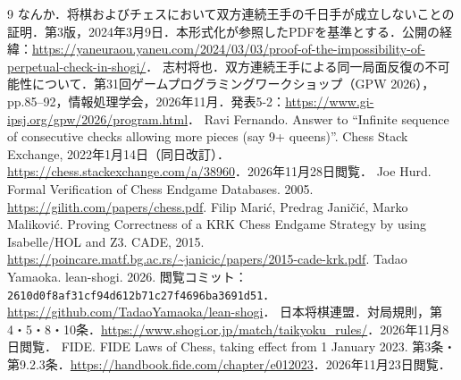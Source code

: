 \documentclass[a4paper,11pt]{article}
\theoremstyle{definition}
\begin{document}
\begin{thebibliography}{9}
なんか．将棋およびチェスにおいて双方連続王手の千日手が成立しないことの証明．第3版，2024年3月9日．本形式化が参照したPDFを基準とする．公開の経緯：\url{https://yaneuraou.yaneu.com/2024/03/03/proof-of-the-impossibility-of-perpetual-check-in-shogi/}．
志村将也．双方連続王手による同一局面反復の不可能性について．第31回ゲームプログラミングワークショップ（GPW 2026），pp.85--92，情報処理学会，2026年11月．発表5-2：\url{https://www.gi-ipsj.org/gpw/2026/program.html}．
Ravi Fernando. Answer to ``Infinite sequence of consecutive checks allowing more pieces (say 9+ queens)''. Chess Stack Exchange, 2022年1月14日（同日改訂）．\url{https://chess.stackexchange.com/a/38960}．2026年11月28日閲覧．
Joe Hurd. Formal Verification of Chess Endgame Databases. 2005. \url{https://gilith.com/papers/chess.pdf}.
Filip Marić, Predrag Janičić, Marko Maliković. Proving Correctness of a KRK Chess Endgame Strategy by using Isabelle/HOL and Z3. CADE, 2015. \url{https://poincare.matf.bg.ac.rs/~janicic/papers/2015-cade-krk.pdf}.
Tadao Yamaoka. lean-shogi. 2026. 閲覧コミット：\nolinkurl{2610d0f8af31cf94d612b71c27f4696ba3691d51}．\url{https://github.com/TadaoYamaoka/lean-shogi}．
日本将棋連盟．対局規則，第4・5・8・10条．\url{https://www.shogi.or.jp/match/taikyoku_rules/}．2026年11月8日閲覧．
FIDE. FIDE Laws of Chess, taking effect from 1 January 2023. 第3条・第9.2.3条．\url{https://handbook.fide.com/chapter/e012023}．2026年11月23日閲覧．
\end{thebibliography}
\end{document}
